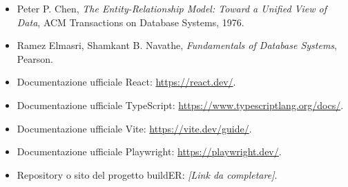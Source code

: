 \documentclass{unipd-thesis-modern}
\newcommand{\placeholder}[1]{\textit{[#1]}}
\newcommand{\builder}{buildER}
\begin{document}
\begin{itemize}
    \item Peter P. Chen, \textit{The Entity-Relationship Model: Toward a Unified View of Data}, ACM Transactions on Database Systems, 1976.
    \item Ramez Elmasri, Shamkant B. Navathe, \textit{Fundamentals of Database Systems}, Pearson.
    \item Documentazione ufficiale React: \url{https://react.dev/}.
    \item Documentazione ufficiale TypeScript: \url{https://www.typescriptlang.org/docs/}.
    \item Documentazione ufficiale Vite: \url{https://vite.dev/guide/}.
    \item Documentazione ufficiale Playwright: \url{https://playwright.dev/}.
    \item Repository o sito del progetto \builder: \placeholder{Link da completare}.
\end{itemize}
\end{document}
